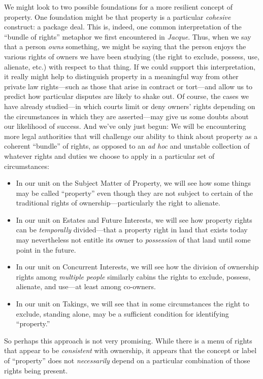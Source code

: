 We might look to two possible foundations for a more resilient concept of
property. One foundation might be that property is a particular
\textit{cohesive} construct: a package deal. This is, indeed, one common
interpretation of the ``bundle of rights'' metaphor we first encountered in
\textit{Jacque}. Thus, when we say that a person \textit{owns} something, we
might be saying that the person enjoys the various rights of owners we have
been studying (the right to exclude, possess, use, alienate, etc.) with respect
to that thing. If we could support this interpretation, it really might help to
distinguish property in a meaningful way from other private law rights---such
as those that arise in contract or tort---and allow us to predict how
particular disputes are likely to shake out. Of course, the cases we have
already studied---in which courts limit or deny owners' rights depending on the
circumstances in which they are asserted---may give us some doubts about our
likelihood of success. And we've only just begun: We will be encountering more
legal authorities that will challenge our ability to think about property as a
coherent ``bundle'' of rights, as opposed to an \textit{ad hoc} and unstable
collection of whatever rights and duties we choose to apply in a particular set
of circumstances:
\begin{itemize}
\item In our unit on the Subject Matter of Property, we will see how some things
may be called ``property'' even though they are not subject to certain of the
traditional rights of ownership---particularly the right to alienate.

\item In our unit on Estates and Future Interests, we will see how property
rights can be \textit{temporally} divided---that a property right in land that
exists today may nevertheless not entitle its owner to \textit{possession} of
that land until some point in the future.

\item In our unit on Concurrent Interests, we will see how the division of
ownership rights among \textit{multiple people} similarly cabins the rights to
exclude, possess, alienate, and use---at least among co-owners.

\item In our unit on Takings, we will see that in some circumstances the right
to exclude, standing alone, may be a sufficient condition for identifying
``property.''
\end{itemize}
So perhaps this approach is not very promising. While there is a menu of rights
that appear to be \textit{consistent} with ownership, it appears that the
concept or label of ``property'' does not \textit{necessarily} depend on a
particular combination of those rights being present.

